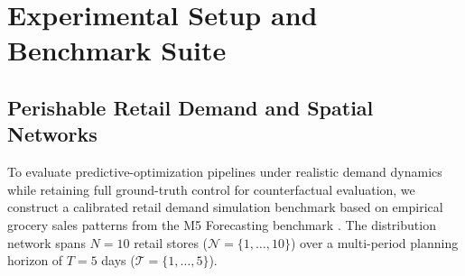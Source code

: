 \documentclass[11pt,a4paper]{article}
\theoremstyle{definition}
\theoremstyle{remark}
\begin{document}
\section{Experimental Setup and Benchmark Suite}
\label{sec:experimental_setup}

\subsection{Perishable Retail Demand and Spatial Networks}
\label{subsec:networks}
To evaluate predictive-optimization pipelines under realistic demand dynamics while retaining full ground-truth control for counterfactual evaluation, we construct a calibrated retail demand simulation benchmark based on empirical grocery sales patterns from the M5 Forecasting benchmark \citep{makridakis2022m5}. The distribution network spans $N = 10$ retail stores ($\mathcal{N} = \{1, \dots, 10\}$) over a multi-period planning horizon of $T = 5$ days ($\mathcal{T} = \{1, \dots, 5\}$).
\end{document}
